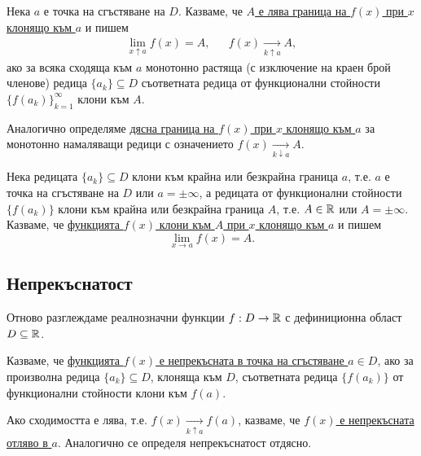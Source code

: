\documentclass[numbers=endperiod, DIV=15, bibliography=totocnumbered]{scrartcl}
\begin{document}
\begin{definition}
  Нека $a$ е точка на сгъстяване на $D$. Казваме, че \uline{$A$ е лява граница на $f(x)$ при $x$ клонящо към $a$} и пишем
  \begin{align*}
    \lim_{x \uparrow a} f(x) = A,
    &&
    f(x) \underset {k \uparrow a} \longrightarrow A,
  \end{align*}
  ако за всяка сходяща към $a$ монотонно растяща (с изключение на краен брой членове) редица $\{ a_k \} \subseteq D$ съответната редица от функционални стойности ${\{ f(a_k) \}}_{k=1}^\infty$ клони към $A$.

  Аналогично определяме \uline{дясна граница на $f(x)$ при $x$ клонящо към $a$} за монотонно намаляващи редици с означението $f(x) \underset {k \downarrow a} \longrightarrow A$.
\end{definition}

\begin{definition}
  Нека редицата $\{ a_k \} \subseteq D$ клони към крайна или безкрайна граница $a$, т.е. $a$ е точка на сгъстяване на $D$ или $a = \pm \infty$, а редицата от функционални стойности $\{ f(a_k) \}$ клони към крайна или безкрайна граница $A$, т.е. $A \in \mathbb{R}$ или $A = \pm \infty$. Казваме, че \uline{функцията $f(x)$ клони към $A$ при $x$ клонящо към $a$} и пишем
  \begin{displaymath}
    \lim_{x \to a} f(x) = A.
  \end{displaymath}
\end{definition}

\subsection{Непрекъснатост}

Отново разглеждаме реалнозначни функции $f: D \to \mathbb{R}$ с дефиниционна област $D \subseteq \mathbb{R}$.

\begin{definition}
  Казваме, че \uline{функцията $f(x)$ е непрекъсната в точка на сгъстяване $a \in D$}, ако за произволна редица $\{ a_k \} \subseteq D$, клоняща към $D$, съответната редица $\{ f(a_k) \}$ от функционални стойности клони към $f(a)$.

  Ако сходимостта е лява, т.е. $f(x) \underset {k \uparrow a} \longrightarrow f(a)$, казваме, че \uline{$f(x)$ е непрекъсната отляво в $a$}. Аналогично се определя непрекъснатост отдясно.
\end{definition}
\end{document}
